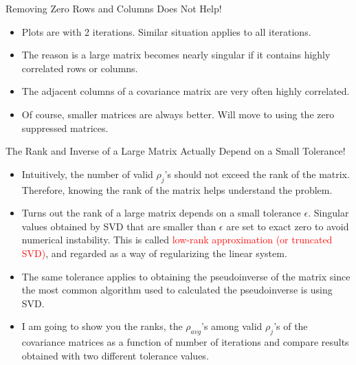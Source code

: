 \documentclass[aspectratio=169]{beamer}
\begin{document}
\begin{frame}{Removing Zero Rows and Columns Does Not Help!}
  \begin{itemize}
    \scriptsize
    \item Plots are with 2 iterations. Similar situation applies to all iterations.
    \item The reason is a large matrix becomes nearly singular if it contains highly correlated rows or columns. 
    \item The adjacent columns of a covariance matrix are very often highly correlated.
    \item Of course, smaller matrices are always better. Will move to using the zero suppressed matrices.
  \end{itemize}
\end{frame}

\begin{frame}{The Rank and Inverse of a Large Matrix Actually Depend on a Small Tolerance!}
  \begin{itemize}
    \item Intuitively, the number of valid $\rho_j$'s should not exceed the rank of the matrix. Therefore, knowing the rank of the matrix helps understand the problem.
    \item Turns out the rank of a large matrix depends on a small tolerance $\epsilon$. Singular values obtained by SVD that are smaller than $\epsilon$ are set to exact zero to avoid numerical instability. This is called \textcolor{red}{low-rank approximation (or truncated SVD)}, and regarded as a way of regularizing the linear system.
    \item The same tolerance applies to obtaining the pseudoinverse of the matrix since the most common algorithm used to calculated the pseudoinverse is using SVD.
    \item I am going to show you the ranks, the $\rho_{avg}$'s among valid $\rho_j$'s of the covariance matrices as a function of number of iterations and compare results obtained with two different tolerance values.
  \end{itemize}
\end{frame}
\end{document}
